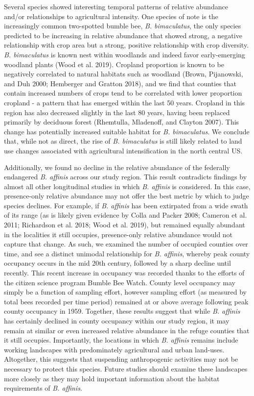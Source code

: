 \documentclass[11pt,]{article}
\begin{document}
Several species showed interesting temporal patterns of relative
abundance and/or relationships to agricultural intensity. One species of
note is the increasingly common two-spotted bumble bee, \emph{B.
bimaculatus}, the only species predicted to be increasing in relative
abundance that showed strong, a negative relationship with crop area but
a strong, positive relationship with crop diversity. \emph{B.
bimaculatus} is known nest within woodlands and indeed favor
early-emerging woodland plants (Wood et al. 2019). Cropland proportion
is known to be negatively correlated to natural habitats such as
woodland (Brown, Pijanowski, and Duh 2000; Hemberger and Gratton 2018),
and we find that counties that contain increased numbers of crops tend
to be correlated with lower proportion cropland - a pattern that has
emerged within the last 50 years. Cropland in this region has also
decreased slightly in the last 80 years, having been replaced primarily
by deciduous forest (Rhemtulla, Mladenoff, and Clayton 2007). This
change has potentially increased suitable habitat for \emph{B.
bimaculatus}. We conclude that, while not as direct, the rise of
\emph{B. bimaculatus} is still likely related to land use changes
associated with agricultural intensification in the north central US.

Additionally, we found no decline in the relative abundance of the
federally endangered \emph{B. affinis} across our study region. This
result contradicts findings by almost all other longitudinal studies in
which \emph{B. affinis} is considered. In this case, presence-only
relative abundance may not offer the best metric by which to judge
species declines. For example, if \emph{B. affinis} has been extirpated
from a wide swath of its range (as is likely given evidence by Colla and
Packer 2008; Cameron et al. 2011; Richardson et al. 2018; Wood et al.
2019), but remained equally abundant in the localities it still
occupies, presence-only relative abundance would not capture that
change. As such, we examined the number of occupied counties over time,
and see a distinct unimodal relationship for \emph{B. affinis}, whereby
peak county occupancy occurs in the mid 20th century, followed by a
sharp decline until recently. This recent increase in occupancy was
recorded thanks to the efforts of the citizen science program Bumble Bee
Watch. County level occupancy may simply be a function of sampling
effort, however sampling effort (as measured by total bees recorded per
time period) remained at or above average following peak county
occupancy in 1959. Together, these results suggest that while \emph{B.
affinis} has certainly declined in county occupancy within our study
region, it may remain at similar or even increased relative abundance in
the refuge counties that it still occupies. Importantly, the locations
in which \emph{B. affinis} remains include working landscapes with
predominately agricultural and urban land-uses. Altogether, this
suggests that suspending anthropogenic activities may not be necessary
to protect this species. Future studies should examine these landscapes
more closely as they may hold important information about the habitat
requirements of \emph{B. affinis}.
\end{document}

